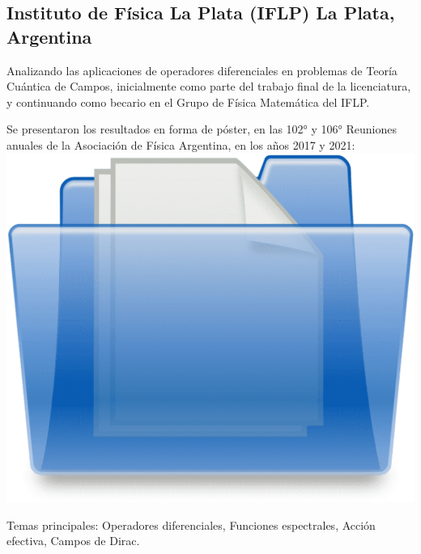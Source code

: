 \subsection{{Instituto de Física La Plata (IFLP) \hfill La Plata, Argentina}}
\begin{zitemize}
\item Analizando las aplicaciones de operadores diferenciales en problemas de Teoría Cuántica de Campos, inicialmente como parte del trabajo final de la licenciatura, y continuando como becario en el Grupo de Física Matemática del IFLP.
\item Se presentaron los resultados en forma de póster, en las 102° y 106° Reuniones anuales de la Asociación de Física Argentina, en los años 2017 y 2021: \href{https://drive.google.com/drive/folders/1NhlFmvg1QMwYczq2GqnXWXXOQsxqrctO?usp=sharing}{\includegraphics[scale=0.01]{folder.png}}
\item Temas principales: Operadores diferenciales, Funciones espectrales, Acción efectiva, Campos de Dirac.
\end{zitemize}

